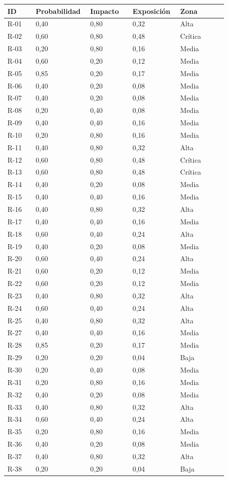 \documentclass[11pt]{article}
\begin{document}
\begin{longtable}{p{0.12\linewidth}p{0.18\linewidth}p{0.18\linewidth}p{0.20\linewidth}p{0.20\linewidth}}
\toprule
\textbf{ID} & \textbf{Probabilidad} & \textbf{Impacto} & \textbf{Exposición} & \textbf{Zona} \\
\midrule
\endhead
\bottomrule
\endlastfoot
R-01 & 0,40 & 0,80 & 0,32 & Alta \\
R-02 & 0,60 & 0,80 & 0,48 & Crítica \\
R-03 & 0,20 & 0,80 & 0,16 & Media \\
R-04 & 0,60 & 0,20 & 0,12 & Media \\
R-05 & 0,85 & 0,20 & 0,17 & Media \\
R-06 & 0,40 & 0,20 & 0,08 & Media \\
R-07 & 0,40 & 0,20 & 0,08 & Media \\
R-08 & 0,20 & 0,40 & 0,08 & Media \\
R-09 & 0,40 & 0,40 & 0,16 & Media \\
R-10 & 0,20 & 0,80 & 0,16 & Media \\
R-11 & 0,40 & 0,80 & 0,32 & Alta \\
R-12 & 0,60 & 0,80 & 0,48 & Crítica \\
R-13 & 0,60 & 0,80 & 0,48 & Crítica \\
R-14 & 0,40 & 0,20 & 0,08 & Media \\
R-15 & 0,40 & 0,40 & 0,16 & Media \\
R-16 & 0,40 & 0,80 & 0,32 & Alta \\
R-17 & 0,40 & 0,40 & 0,16 & Media \\
R-18 & 0,60 & 0,40 & 0,24 & Alta \\
R-19 & 0,40 & 0,20 & 0,08 & Media \\
R-20 & 0,60 & 0,40 & 0,24 & Alta \\
R-21 & 0,60 & 0,20 & 0,12 & Media \\
R-22 & 0,60 & 0,20 & 0,12 & Media \\
R-23 & 0,40 & 0,80 & 0,32 & Alta \\
R-24 & 0,60 & 0,40 & 0,24 & Alta \\
R-25 & 0,40 & 0,80 & 0,32 & Alta \\
R-27 & 0,40 & 0,40 & 0,16 & Media \\
R-28 & 0,85 & 0,20 & 0,17 & Media \\
R-29 & 0,20 & 0,20 & 0,04 & Baja \\
R-30 & 0,20 & 0,40 & 0,08 & Media \\
R-31 & 0,20 & 0,80 & 0,16 & Media \\
R-32 & 0,40 & 0,20 & 0,08 & Media \\
R-33 & 0,40 & 0,80 & 0,32 & Alta \\
R-34 & 0,60 & 0,40 & 0,24 & Alta \\
R-35 & 0,20 & 0,80 & 0,16 & Media \\
R-36 & 0,40 & 0,20 & 0,08 & Media \\
R-37 & 0,40 & 0,80 & 0,32 & Alta \\
R-38 & 0,20 & 0,20 & 0,04 & Baja \\
\end{longtable}
\end{document}
